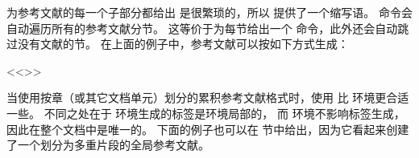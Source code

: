 \begin{ltxexample}
\usepackage{<<nameref>>}
\end{ltxexample}
%
为参考文献的每一个子部分都给出  是很繁琐的，所以 \biblatex 提供了一个缩写语。
 命令会自动遍历所有的参考文献分节。
这等价于为每节给出一个  命令，此外还会自动跳过没有文献的节。
在上面的例子中，参考文献可以按如下方式生成：

\begin{ltxexample}
\printbibheading
<<\bibbysection[heading=subbibliography]>>
\end{ltxexample}
%
当使用按章（或其它文档单元）划分的累积参考文献格式时，使用  比  环境更合适一些。
不同之处在于  环境生成的标签是环境局部的，
而  环境不影响标签生成，因此在整个文档中是唯一的。
下面的例子也可以在  节中给出，因为它看起来创建了一个划分为多重片段的全局参考文献。

